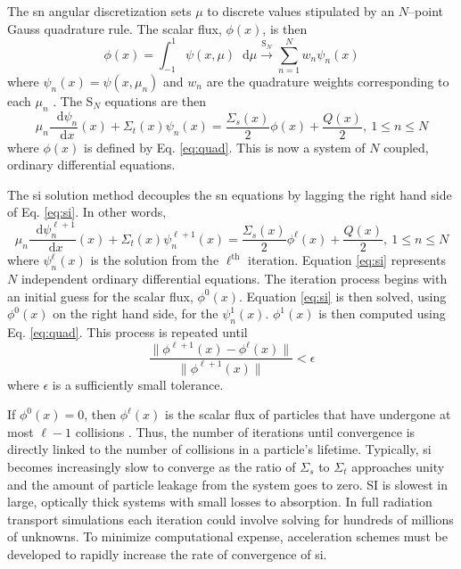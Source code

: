 \documentclass[11 pt]{article}
\newcommand{\SN}{S$_N$\xspace}
\newcommand{\ud}{\mathop{}\!\mathrm{d}} %
\newcommand{\dderiv}[2]{\frac{\ud #1}{\ud #2}}
\begin{document}
	The \gls{sn} angular discretization sets $\mu$ to discrete values stipulated by an $N$--point Gauss quadrature rule. The scalar flux, $\phi(x)$, is then 
		\begin{equation} \label{eq:quad}
			\phi(x) = \int_{-1}^1 \psi(x, \mu) \ud\mu 
				\xrightarrow{\text{S}_N} \sum_{n=1}^N w_n \psi_n(x)
		\end{equation}
	where $\psi_n(x) = \psi(x,\mu_n)$ and $w_n$ are the quadrature weights corresponding to each $\mu_n$ \cite{llnl}. The \SN equations are then 
		\begin{equation} \label{eq:sn}
			\mu_n \dderiv{\psi_n}{x}(x) + \Sigma_t(x) \psi_n(x) = 
			\frac{\Sigma_s(x)}{2} \phi(x) + \frac{Q(x)}{2}, \ 1 \leq n \leq N
		\end{equation}
	where $\phi(x)$ is defined by Eq. \ref{eq:quad}. This is now a system of $N$ coupled, ordinary differential equations. 

	The \gls{si} solution method decouples the \gls{sn} equations by lagging the right hand side of Eq. \ref{eq:si}. In other words, 
		\begin{equation} \label{eq:si}
			\mu_n \dderiv{\psi_n^{\ell+1}}{x}(x) + \Sigma_t(x) \psi_n^{\ell+1}(x) = 
			\frac{\Sigma_s(x)}{2} \phi^{\ell}(x) + \frac{Q(x)}{2}, \ 1 \leq n \leq N
		\end{equation}
	where $\psi_n^\ell(x)$ is the solution from the $\ell^\text{th}$ iteration. Equation \ref{eq:si} represents $N$ independent ordinary differential equations. The iteration process begins with an initial guess for the scalar flux, $\phi^0(x)$. Equation \ref{eq:si} is then solved, using $\phi^0(x)$ on the right hand side, for the $\psi_n^1(x)$. $\phi^1(x)$ is then computed using Eq. \ref{eq:quad}.  
	This process is repeated until 
		\begin{equation} \label{eq:converg}
			\frac{\|\phi^{\ell+1}(x) - \phi^{\ell}(x)\|}{\|\phi^{\ell+1}(x)\|} < \epsilon
		\end{equation}
	where $\epsilon$ is a sufficiently small tolerance. 

	If $\phi^0(x) = 0$, then $\phi^\ell(x)$ is the scalar flux of particles that have undergone at most $\ell - 1$ collisions \cite{adams}. Thus, the number of iterations until convergence is directly linked to the number of collisions in a particle's lifetime. Typically, \gls{si} becomes increasingly slow to converge as the ratio of $\Sigma_s$ to $\Sigma_t$ approaches unity and the amount of particle leakage from the system goes to zero. SI is slowest in large, optically thick systems with small losses to absorption. In full radiation transport simulations each iteration could involve solving for hundreds of millions of unknowns. To minimize computational expense, acceleration schemes must be developed to rapidly increase the rate of convergence of \gls{si}. 
\end{document}
